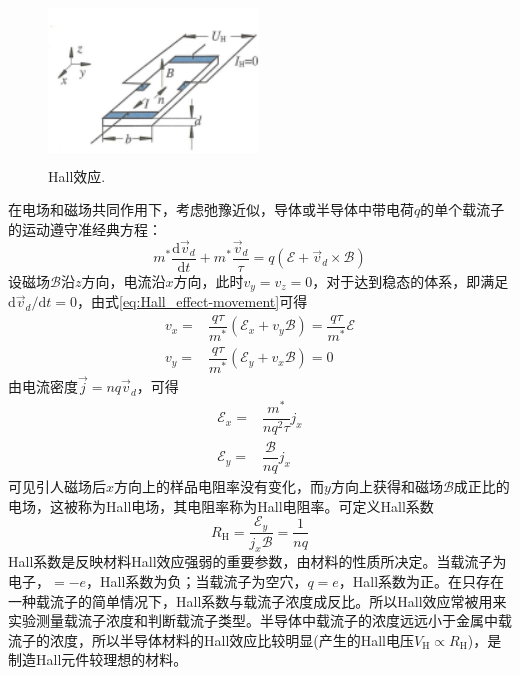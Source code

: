 \begin{figure}[h!]
\centering
\vspace*{-0.10in}
\includegraphics[height=1.70in,width=2.20in,viewport=0 0 42 28,clip]{Figures/Hall_effect.png}
\caption{\small \textrm{Hall效应.}}%
\label{Fig:Hall_effect}
\end{figure}
在电场和磁场共同作用下，考虑弛豫近似，导体或半导体中带电荷$q$的单个载流子的运动遵守准经典方程：
\begin{equation}
	m^{\ast}\dfrac{\mathrm{d}\vec v_d}{\mathrm{d}t}+m^{\ast}\dfrac{\vec v_d}{\tau}=q(\mathscr{E}+\vec v_d\times\mathscr{B})
	\label{eq:Hall_effect-movement}
\end{equation}
设磁场$\mathscr{B}$沿$z$方向，电流沿$x$方向，此时$v_y=v_z=0$，对于达到稳态的体系，即满足$\mathrm{d}\vec v_d/\mathrm{d}t=0$，由式\eqref{eq:Hall_effect-movement}可得
\begin{displaymath}
	\begin{aligned}
		v_x=&\dfrac{q\tau}{m^{\ast}}(\mathscr{E}_x+v_y\mathscr{B})=\dfrac{q\tau}{m^{\ast}}\mathscr{E}\\
		v_y=&\dfrac{q\tau}{m^{\ast}}(\mathscr{E}_y+v_x\mathscr{B})=0
	\end{aligned}
\end{displaymath} 
由电流密度$\vec j=nq\vec v_d$，可得
\begin{equation}
	\begin{aligned}
		\mathscr{E}_x=&\dfrac{m^{\ast}}{nq^2\tau}j_x\\
	\mathscr{E}_y=&\dfrac{\mathscr{B}}{nq}j_x
	\end{aligned} 
	\label{eq:Hall_effect-Electric_Field}
\end{equation} 
可见引人磁场后$x$方向上的样品电阻率没有变化，而$y$方向上获得和磁场$\mathscr{B}$成正比的电场，这被称为Hall电场，其电阻率称为Hall电阻率。可定义Hall系数
\begin{equation}
	R_{\mathrm{H}}=\dfrac{\mathscr{E}_y}{j_x\mathscr{B}}=\dfrac1{nq}
	\label{eq:Hall_coefficient}
\end{equation}
Hall系数是反映材料Hall效应强弱的重要参数，由材料的性质所决定。当载流子为电子，$=-e$，Hall系数为负；当载流子为空穴，$q=e$，Hall系数为正。在只存在一种载流子的简单情况下，Hall系数与载流子浓度成反比。所以Hall效应常被用来实验测量载流子浓度和判断载流子类型。半导体中载流子的浓度远远小于金属中载流子的浓度，所以半导体材料的Hall效应比较明显(产生的Hall电压$V_{\mathrm{H}}\propto R_{\mathrm{H}}$)，是制造Hall元件较理想的材料。

